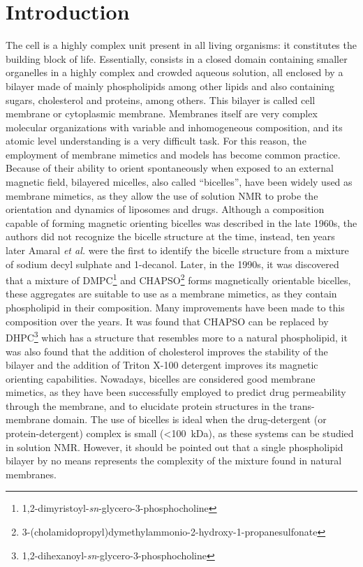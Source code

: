 \documentclass[3p,preprint,review]{elsarticle}
\begin{document}
	\section{Introduction}
	The cell is a highly complex unit present in all living organisms: it
	constitutes the building block of life. Essentially, consists in a closed
	domain
	containing smaller organelles in a highly complex and crowded aqueous solution,
	all enclosed by a bilayer made of mainly phospholipids among other lipids and
  also containing sugars, cholesterol and proteins, among others. This bilayer is called
	cell membrane or cytoplasmic membrane. Membranes itself are very complex
	molecular organizations with variable and inhomogeneous composition, and its
	atomic level understanding is a very difficult task. For this reason, the
	employment of
	membrane mimetics and models has become common practice.\cite{Bondar2019}\\
	Because of their ability to orient spontaneously when exposed to an external
	magnetic field, bilayered micelles, also called ``bicelles'', have been widely
	used as membrane mimetics, as they allow the use of solution NMR to probe the
	orientation and dynamics of liposomes and
	drugs\cite{Beaugrand2016,Montecinos2007,Ruiz-Fernandez2016}. Although a
	composition capable of forming magnetic orienting bicelles was described in the
	late 1960s\cite{Lawson1967}, the authors did not recognize the bicelle structure
	at the time, instead, ten years later Amaral \textit{et al.} were the first to
	identify the bicelle structure
	from a mixture of sodium decyl sulphate and
	1-decanol\cite{Amaral1979}. Later,
	in the 1990s, it was discovered that a
	mixture of DMPC\footnote{1,2-dimyristoyl-\textit{sn}-glycero-3-phosphocholine}
	and
	CHAPSO\footnote{3-(cholamidopropyl)dymethylammonio-2-hydroxy-1-propanesulfonate}
	forms magnetically orientable bicelles\cite{Sanders1990}, these aggregates are
	suitable to use as a membrane mimetics, as they contain
	phospholipid in their composition. Many improvements have been made to this
	composition over the years. It was found that CHAPSO can be replaced by
	DHPC\footnote{1,2-dihexanoyl-\textit{sn}-glycero-3-phosphocholine} which has a
	structure that resembles more to a natural phospholipid\cite{Sanders1992}, it
	was also found
	that the addition of cholesterol improves the stability of the
	bilayer\cite{Shapiro2010} and
	the addition of Triton X-100 detergent improves its magnetic orienting
	capabilities\cite{Park2010}. Nowadays, bicelles are considered good membrane
	mimetics, as they have been successfully employed to predict drug permeability
	through the membrane\cite{Sun2008,Durr2013,Matsumori2007,Koenig2005}, and to
	elucidate
	protein structures in the trans-membrane domain\cite{Durr2012}. The use of
	bicelles is ideal when
	the
	drug-detergent (or protein-detergent) complex is small (<\SI{100}{kDa}), as
	these systems can be studied in solution
	NMR\cite{Warschawski2011,Raschle2010,Sanders2006}. However, it should be
	pointed out that a single phospholipid bilayer by no means represents the
	complexity of the mixture found in natural membranes.\\
	
\end{document}

